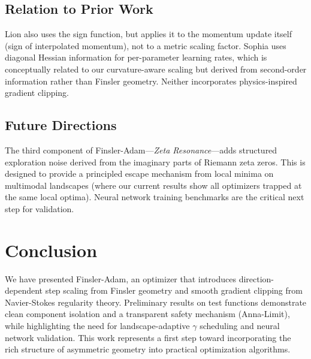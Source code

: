 \documentclass[11pt,a4paper,twocolumn]{article}
\begin{document}
\subsection{Relation to Prior Work}

Lion \cite{chen2023lion} also uses the sign function, but applies it to the momentum update itself (sign of interpolated momentum), not to a metric scaling factor. Sophia \cite{liu2023sophia} uses diagonal Hessian information for per-parameter learning rates, which is conceptually related to our curvature-aware scaling but derived from second-order information rather than Finsler geometry. Neither incorporates physics-inspired gradient clipping.

\subsection{Future Directions}

The third component of Finsler-Adam---\emph{Zeta Resonance}---adds structured exploration noise derived from the imaginary parts of Riemann zeta zeros. This is designed to provide a principled escape mechanism from local minima on multimodal landscapes (where our current results show all optimizers trapped at the same local optima). Neural network training benchmarks are the critical next step for validation.

\section{Conclusion}

We have presented Finsler-Adam, an optimizer that introduces direction-dependent step scaling from Finsler geometry and smooth gradient clipping from Navier-Stokes regularity theory. Preliminary results on test functions demonstrate clean component isolation and a transparent safety mechanism (Anna-Limit), while highlighting the need for landscape-adaptive $\gamma$ scheduling and neural network validation. This work represents a first step toward incorporating the rich structure of asymmetric geometry into practical optimization algorithms.
\end{document}
